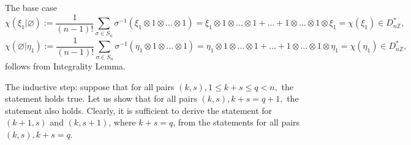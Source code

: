 \documentclass[a4paper,14pt]{article}
\newcommand{\Z}{\mathbb{Z}}
\begin{document}
The base case
$$
\chi(\xi_1| \varnothing) := \frac{1}{(n-1)!} \sum_{\sigma \in S_n}  \sigma^{-1}(\xi_1\otimes 1\otimes \ldots \otimes 1)  =  \xi_1\otimes 1\otimes \ldots \otimes 1 + \ldots +  1\otimes \ldots \otimes 1\otimes  \xi_1 = \chi(\xi_1) \in   D^*_{n\Z},
$$ 
$$
\chi(\varnothing | \eta_1 ) := \frac{1}{(n-1)!} \sum_{\sigma \in S_n}  \sigma^{-1}(\eta_1\otimes 1\otimes \ldots \otimes 1)  =  \eta_1\otimes 1\otimes \ldots \otimes 1 + \ldots +  1\otimes \ldots \otimes 1\otimes  \eta_1 = \chi(\eta_1)  \in   D^*_{n\Z},
$$
follows from Integrality Lemma. 

The inductive step: suppose that for all pairs $(k,s), 1\le k+s\le q< n,$ the statement holds true. Let us show that for all pairs $(k,s), k+s =q+1,$ the statement also holds. Clearly, it is sufficient to derive the statement for $(k+1,s)$ and $(k,s+1)$, where $k+s=q$, from the statements for all pairs $(k,s), k+s=q$.
\end{document}

